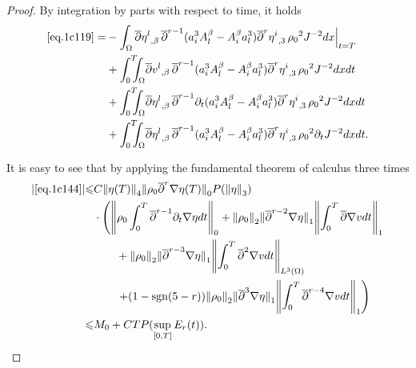 \documentclass[12pt,twoside,reqno]{amsart}
\numberwithin{equation}{section}
\theoremstyle{definition}
\theoremstyle{remark}
\begin{document}
\begin{proof}
By integration by parts with respect to time, it holds
\begin{align}
  \eqref{eq.1c119}=&-\int_\Omega {\overline{\partial}} {{{\eta^l}}_{,{\beta}}\,}{\overline{\partial}}^{r-1}(a^3_iA^\beta_l-A^\beta_ia^3_l){{{{\overline{\partial}}^r \eta^i}}_{,{3}}\,}{\rho_0}^2  J^{-2}dx\Big|_{t=T}\label{eq.1c144}\\
  &+{\int_0^T\!\!\!\!\int_\Omega }  {\overline{\partial}} {{{v^l}}_{,{\beta}}\,}{\overline{\partial}}^{r-1}(a^3_iA^\beta_l-A^\beta_ia^3_l){{{{\overline{\partial}}^r \eta^i}}_{,{3}}\,}{\rho_0}^2  J^{-2}dxdt\label{eq.1c145}\\
  &+{\int_0^T\!\!\!\!\int_\Omega }  {\overline{\partial}} {{{\eta^l}}_{,{\beta}}\,}{\overline{\partial}}^{r-1}{\partial}_t(a^3_iA^\beta_l-A^\beta_ia^3_l){{{{\overline{\partial}}^r \eta^i}}_{,{3}}\,}{\rho_0}^2  J^{-2}dxdt\label{eq.1c146}\\
  &+{\int_0^T\!\!\!\!\int_\Omega }  {\overline{\partial}} {{{\eta^l}}_{,{\beta}}\,}{\overline{\partial}}^{r-1}(a^3_iA^\beta_l-A^\beta_ia^3_l){{{{\overline{\partial}}^r \eta^i}}_{,{3}}\,}{\rho_0}^2  {\partial}_tJ^{-2}dxdt.\label{eq.1c147}
\end{align}

It is easy to see that by applying the fundamental theorem of calculus three times
\begin{align*}
  {\vert{\eqref{eq.1c144}}\vert}{\leqslant}&C{\Vert{\eta(T)}\Vert}_4{\Vert{{\rho_0} {\overline{\partial}}^r{\nabla}\eta(T)}\Vert}_0 P({\Vert{\eta}\Vert}_3) \\
  &\cdot\left({\left\Vert{{\rho_0} \int_0^T{\overline{\partial}}^{r-1}{\partial}_t{\nabla}\eta dt}\right\Vert}_0 +{\Vert{\rho_0}\Vert}_2{\Vert{{\overline{\partial}}^{r-2}{\nabla}\eta}\Vert}_1{\left\Vert{\int_0^T{\overline{\partial}}{\nabla} v dt}\right\Vert}_1\right.\\
  &\qquad+{\Vert{\rho_0}\Vert}_2{\Vert{{\overline{\partial}}^{r-3}{\nabla}\eta}\Vert}_1{\left\Vert{\int_0^T{\overline{\partial}}^2{\nabla} vdt}\right\Vert}_{L^3(\Omega)}\\
  &\qquad\left.+(1-{\mathrm{sgn}}(5-r)){\Vert{\rho_0}\Vert}_2{\Vert{{\overline{\partial}}^3{\nabla}\eta }\Vert}_1{\left\Vert{\int_0^T {\overline{\partial}}^{r-4}{\nabla} v dt}\right\Vert}_1\right)\\
  {\leqslant} &M_0+CTP(\sup_{[0,T]}E_r(t)).
\end{align*}


\end{proof}
\end{document}
